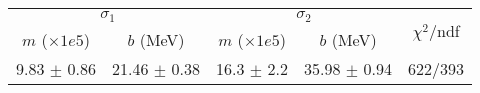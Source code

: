 \begin{tabular}{cc|cc||c}
\multicolumn{2}{c|}{$\sigma_1$} & \multicolumn{2}{|c}{$\sigma_2$}  & \multirow{2}{*}{$\chi^2/$ndf}\\
$m$ ($\times1e5$) & $b$ (MeV) & $m$ ($\times1e5$) & $b$ (MeV)  & \\
\hline
9.83 $\pm$ 0.86 & 21.46 $\pm$ 0.38 & 16.3 $\pm$ 2.2 & 35.98 $\pm$ 0.94 & 622/393\\
\end{tabular}
